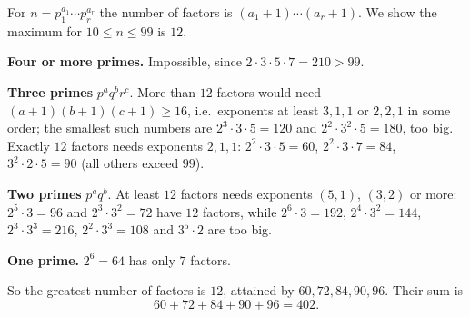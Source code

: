 For $n=p_1^{a_1}\cdots p_r^{a_r}$ the number of factors is $(a_1+1)\cdots(a_r+1)$. We show the maximum for $10\le n\le99$ is $12$.

\textbf{Four or more primes.} Impossible, since $2\cdot3\cdot5\cdot7=210>99$.

\textbf{Three primes} $p^aq^br^c$. More than $12$ factors would need $(a+1)(b+1)(c+1)\ge16$, i.e.\ exponents at least $3,1,1$ or $2,2,1$ in some order; the smallest such numbers are $2^3\cdot3\cdot5=120$ and $2^2\cdot3^2\cdot5=180$, too big. Exactly $12$ factors needs exponents $2,1,1$: $2^2\cdot3\cdot5=60$, $2^2\cdot3\cdot7=84$, $3^2\cdot2\cdot5=90$ (all others exceed $99$).

\textbf{Two primes} $p^aq^b$. At least $12$ factors needs exponents $(5,1)$, $(3,2)$ or more: $2^5\cdot3=96$ and $2^3\cdot3^2=72$ have $12$ factors, while $2^6\cdot3=192$, $2^4\cdot3^2=144$, $2^3\cdot3^3=216$, $2^2\cdot3^3=108$ and $3^5\cdot2$ are too big.

\textbf{One prime.} $2^6=64$ has only $7$ factors.

So the greatest number of factors is $12$, attained by $60,72,84,90,96$. Their sum is
\[
60+72+84+90+96=\boxed{402}.
\]
